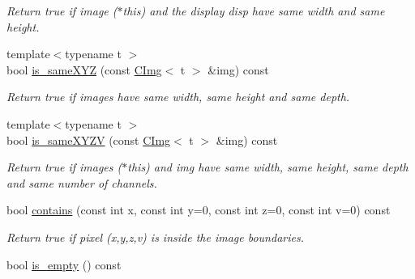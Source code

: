 \begin{DoxyCompactItemize}
\begin{DoxyCompactList}\small\item\em Return {\ttfamily true} if image {\ttfamily }($\ast$this) and the display {\ttfamily disp} have same width and same height. \item\end{DoxyCompactList}\item 
\hypertarget{structcimg__library_1_1_c_img_ad7eed98e5f834320d33a5fe748d1a158}{
{\footnotesize template$<$typename t $>$ }\\bool \hyperlink{structcimg__library_1_1_c_img_ad7eed98e5f834320d33a5fe748d1a158}{is\_\-sameXYZ} (const \hyperlink{structcimg__library_1_1_c_img}{CImg}$<$ t $>$ \&img) const }
\label{structcimg__library_1_1_c_img_ad7eed98e5f834320d33a5fe748d1a158}

\begin{DoxyCompactList}\small\item\em Return {\ttfamily true} if images have same width, same height and same depth. \item\end{DoxyCompactList}\item 
\hypertarget{structcimg__library_1_1_c_img_a74dbcc16c7022ddfd4df2c97925fcd76}{
{\footnotesize template$<$typename t $>$ }\\bool \hyperlink{structcimg__library_1_1_c_img_a74dbcc16c7022ddfd4df2c97925fcd76}{is\_\-sameXYZV} (const \hyperlink{structcimg__library_1_1_c_img}{CImg}$<$ t $>$ \&img) const }
\label{structcimg__library_1_1_c_img_a74dbcc16c7022ddfd4df2c97925fcd76}

\begin{DoxyCompactList}\small\item\em Return {\ttfamily true} if images {\ttfamily }($\ast$this) and {\ttfamily img} have same width, same height, same depth and same number of channels. \item\end{DoxyCompactList}\item 
\hypertarget{structcimg__library_1_1_c_img_a4631fac1a1d17e6702c4c5ca4315bcbd}{
bool \hyperlink{structcimg__library_1_1_c_img_a4631fac1a1d17e6702c4c5ca4315bcbd}{contains} (const int x, const int y=0, const int z=0, const int v=0) const }
\label{structcimg__library_1_1_c_img_a4631fac1a1d17e6702c4c5ca4315bcbd}

\begin{DoxyCompactList}\small\item\em Return {\ttfamily true} if pixel (x,y,z,v) is inside the image boundaries. \item\end{DoxyCompactList}\item 
\hypertarget{structcimg__library_1_1_c_img_a9c9bc7186ce965d46cbb507cde3fb9d5}{
bool \hyperlink{structcimg__library_1_1_c_img_a9c9bc7186ce965d46cbb507cde3fb9d5}{is\_\-empty} () const }
\label{structcimg__library_1_1_c_img_a9c9bc7186ce965d46cbb507cde3fb9d5}


\end{DoxyCompactItemize}
